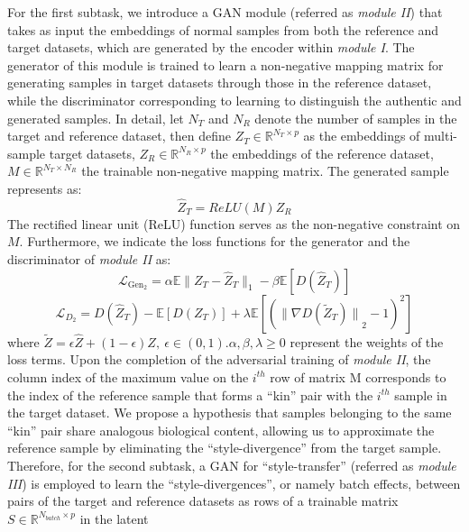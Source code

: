 \documentclass{article}
\begin{document}
For the first subtask, we introduce a GAN module (referred as \textit{module II}) that takes 
as input the embeddings of normal samples from both the reference and target datasets, 
which are generated by the encoder within \textit{module I}. The generator of this module is 
trained to learn a non-negative mapping matrix for generating samples in target 
datasets through those in the reference dataset, while the discriminator corresponding to 
learning to distinguish the authentic and generated samples. In detail, let $N_T$ 
and $N_R$ denote the number of samples in the target and reference dataset, then 
define $Z_T\in\mathbb{R}^{N_T\times p}$ as the embeddings of multi-sample target datasets, 
$Z_R\in\mathbb{R}^{N_R\times p}$ the embeddings of the reference dataset, 
$M\in\mathbb{R}^{N_T\times N_R}$ the trainable non-negative mapping matrix. The generated 
sample represents as: 
\begin{equation}
    {\widehat{Z}}_T=ReLU(M)Z_R 
\end{equation}
The rectified linear unit (ReLU) function serves as the non-negative constraint on $M$. 
Furthermore, we indicate the loss functions for the generator and the discriminator of 
\textit{module II} as:
\begin{equation}
    \mathcal{L}_{\text{Gen}_2} = \alpha\mathbb{E}\|Z_T - \widehat{Z}_T\|_1 - \beta\mathbb{E}[D(\widehat{Z}_T)] 
\end{equation}
\begin{equation}
        \mathcal{L}_{D_2} = D(\widehat{Z}_T) - \mathbb{E}\left[D(Z_T)\right] + \lambda\mathbb{E}\left[({\|\nabla D(\widetilde{Z}_T)\|}_2 - 1)^2\right]
\end{equation}
where  $\widetilde{Z}=\epsilon\widehat{Z}+\left(1-\epsilon\right)Z,\ 
\epsilon\in\left(0,1\right)$.$\alpha,\beta,\lambda\geq0$ represent the weights of the loss 
terms. Upon the completion of the adversarial training of \textit{module II}, the column index of 
the maximum value on the $i^{th}$ row of matrix M corresponds to the index of the reference 
sample that forms a “kin” pair with the $i^{th}$ sample in the target dataset. 
We propose a hypothesis that samples belonging to the same “kin” pair share analogous 
biological content, allowing us to approximate the reference sample by eliminating 
the “style-divergence” from the target sample. Therefore, for the second subtask, a 
GAN for “style-transfer” (referred as \textit{module III}) is employed to learn the 
“style-divergences”, or namely batch effects, between pairs of the target and reference 
datasets as rows of a trainable matrix $S\in\mathbb{R}^{N_{batch}\times p}$ in the latent 
\end{document}
